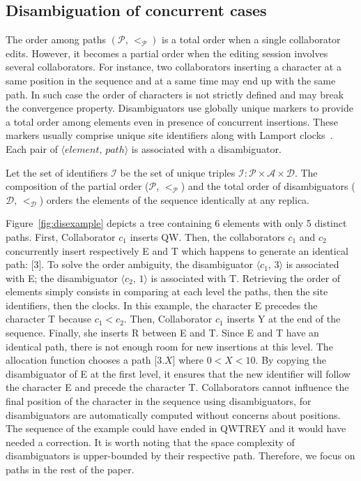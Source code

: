 \subsection{Disambiguation of concurrent cases}
\label{subsec:disambiguation}

The order among paths $(\mathcal{P},\,<_\mathcal{P})$ is a total order when a
single collaborator edits. However, it becomes a partial order when the editing
session involves several collaborators. For instance, two collaborators
inserting a character at a same position in the sequence and at a same time may
end up with the same path. In such case the order of characters is not strictly
defined and may break the convergence property. Disambiguators use globally
unique markers to provide a total order among elements even in presence of
concurrent insertions. These markers usually comprise unique site identifiers
along with Lamport clocks~\cite{lamport1978time}. Each pair of
$\langle element,\,path\rangle$ is associated with a disambiguator.

Let the set of identifiers $\mathcal{I}$ be the set of unique triples
$\mathcal{I}:\mathcal{P}\times \mathcal{A}\times \mathcal{D}$. The composition
of the partial order ($\mathcal{P}$, $<_{\mathcal{P}}$) and the total order of
disambiguators ($\mathcal{D}$, $<_{\mathcal{D}}$) orders the elements of the
sequence identically at any replica.

Figure~\ref{fig:disexample} depicts a tree containing 6 elements with only 5
distinct paths. First, Collaborator $c_1$ inserts QW.  Then, the collaborators
$c_1$ and $c_2$ concurrently insert respectively E and T which happens to
generate an identical path: [$3$]. To solve the order ambiguity, the
disambiguator $\langle c_1,\, 3\rangle$ is associated with E; the disambiguator
$\langle c_2,\, 1\rangle$ is associated with T. Retrieving the order of elements
simply consists in comparing at each level the paths, then the site identifiers,
then the clocks. In this example, the character E precedes the character T
because $c_1 < c_2$. Then, Collaborator $c_1$ inserts Y at the end of the
sequence. Finally, she inserts R between E and T. Since E and T have an
identical path, there is not enough room for new insertions at this level. The
allocation function chooses a path [$3.X$] where $0<X<10$. By copying the
disambiguator of E at the first level, it ensures that the new identifier will
follow the character E and precede the character T.  Collaborators cannot
influence the final position of the character in the sequence using
disambiguators, for disambiguators are automatically computed without concerns
about positions. The sequence of the example could have ended in QWTREY and it
would have needed a correction. It is worth noting that the space complexity of
disambiguators is upper-bounded by their respective path. Therefore, we focus on
paths in the rest of the paper.


